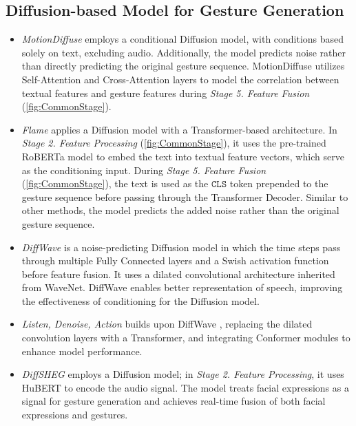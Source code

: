 \subsection{Diffusion-based Model for Gesture Generation}
\label{sec:diffusionbase}




\begin{itemize}
	\item \textit{MotionDiffuse} \cite{zhang2022motiondiffuse} employs a conditional Diffusion model, with conditions based solely on text, excluding audio. Additionally, the model predicts noise rather than directly predicting the original gesture sequence. MotionDiffuse utilizes Self-Attention and Cross-Attention layers to model the correlation between textual features and gesture features during \textit{Stage 5. Feature Fusion} (\autoref{fig:CommonStage}).
	
	\item \textit{Flame} \cite{kim2023flame} applies a Diffusion model with a Transformer-based architecture. In \textit{Stage 2. Feature Processing} (\autoref{fig:CommonStage}), it uses the pre-trained RoBERTa model to embed the text into textual feature vectors, which serve as the conditioning input. During \textit{Stage 5. Feature Fusion} (\autoref{fig:CommonStage}), the text is used as the $\texttt{CLS}$ token prepended to the gesture sequence before passing through the Transformer Decoder. Similar to other methods, the model predicts the added noise rather than the original gesture sequence.
	
	\item \textit{DiffWave} \cite{kong2020diffwave} is a noise-predicting Diffusion model in which the time steps pass through multiple Fully Connected layers and a Swish activation function before feature fusion. It uses a dilated convolutional architecture inherited from WaveNet. DiffWave enables better representation of speech, improving the effectiveness of conditioning for the Diffusion model.
	
	\item \textit{Listen, Denoise, Action} \cite{alexanderson2022listen} builds upon DiffWave \cite{kong2020diffwave}, replacing the dilated convolution layers with a Transformer, and integrating Conformer modules to enhance model performance.
	
	\item \textit{DiffSHEG} \cite{chen2024diffsheg} employs a Diffusion model; in \textit{Stage 2. Feature Processing}, it uses HuBERT to encode the audio signal. The model treats facial expressions as a signal for gesture generation and achieves real-time fusion of both facial expressions and gestures.
	

\end{itemize}
